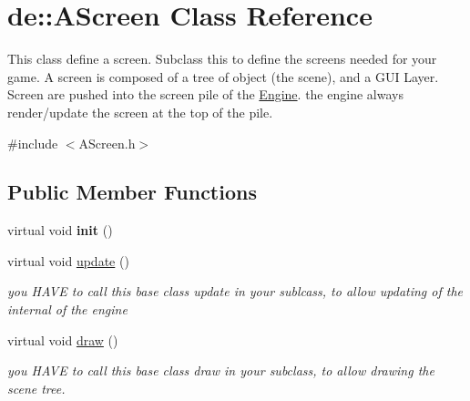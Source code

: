\hypertarget{classde_1_1_a_screen}{
\section{de\-:\-:\-A\-Screen \-Class \-Reference}
\label{classde_1_1_a_screen}
}


\-This class define a screen. \-Subclass this to define the screens needed for your game. \-A screen is composed of a tree of object (the scene), and a \-G\-U\-I \-Layer. \-Screen are pushed into the screen pile of the \hyperlink{classde_1_1_engine}{\-Engine}. the engine always render/update the screen at the top of the pile.  




{\ttfamily \#include $<$\-A\-Screen.\-h$>$}

\subsection*{\-Public \-Member \-Functions}
\begin{DoxyCompactItemize}
\item 
\hypertarget{classde_1_1_a_screen_a28b840683b1ca50d0c983eb0456fe0e3}{
virtual void {\bfseries init} ()}
\label{classde_1_1_a_screen_a28b840683b1ca50d0c983eb0456fe0e3}

\item 
\hypertarget{classde_1_1_a_screen_a705a669f2e391475a5237d530cca09c8}{
virtual void \hyperlink{classde_1_1_a_screen_a705a669f2e391475a5237d530cca09c8}{update} ()}
\label{classde_1_1_a_screen_a705a669f2e391475a5237d530cca09c8}

\begin{DoxyCompactList}\small\item\em you \-H\-A\-V\-E to call this base class update in your sublcass, to allow updating of the internal of the engine \end{DoxyCompactList}\item 
\hypertarget{classde_1_1_a_screen_ad4e30171aeab1824fb60958cfa18ca8b}{
virtual void \hyperlink{classde_1_1_a_screen_ad4e30171aeab1824fb60958cfa18ca8b}{draw} ()}
\label{classde_1_1_a_screen_ad4e30171aeab1824fb60958cfa18ca8b}

\begin{DoxyCompactList}\small\item\em you \-H\-A\-V\-E to call this base class draw in your subclass, to allow drawing the scene tree. \end{DoxyCompactList}\end{DoxyCompactItemize}



